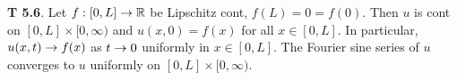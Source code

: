 {\bf T 5.6}. Let $f: [0,L] \rightarrow \mathbb{R}$ be Lipschitz cont, $f(L)=0=f(0)$. Then $u$ is cont on $[0,L] \times [0,\infty)$ and $u(x,0)=f(x)$ for all $x \in [0,L]$. In particular, $u(x,t) \rightarrow f(x)$ as $t \rightarrow 0$ uniformly in $x \in [0,L]$.  The Fourier sine series of $u$ converges to $u$ uniformly on $[0,L] \times [0,\infty)$. 
